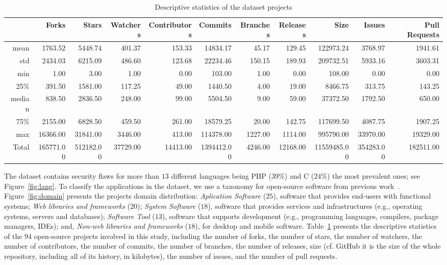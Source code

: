 \documentclass[10pt,conference]{IEEEtran}
\begin{document}
\begin{table}[h]
	\centering
	\caption{Descriptive statistics of the dataset projects}
\begin{tabular}{@{}rrrrrrrrrrr@{}}
\toprule
      & Forks   & Stars   & Watchers & Contributors & Commits  & Branches & Releases & Size      & Issues & Pull Requests  \\ \midrule
mean  & 1763.52 & 5448.74 & 401.37   & 153.33       & 14834.17 & 45.17    & 129.45   & 122973.24 & 3768.97   & 1941.61 \\
std   & 2434.03 & 6215.09 & 486.60   & 123.68       & 22234.46 & 150.15   & 189.93   & 209732.51 & 5933.16   & 3603.31 \\
min   & 1.00       & 3.00       & 1.00        & 0.00            & 103.00      & 1.00        & 0.00        & 108.00       & 0.00         & 0.00       \\
25\%  & 391.50  & 1581.00    & 117.25   & 49.00           & 1440.50  & 4.00        & 19.00       & 8466.75   & 313.75    & 143.25  \\
median  & 838.50  & 2836.50 & 248.00      & 99.00           & 5504.50  & 9.00        & 59.00       & 37372.50  & 1792.50   & 650.00     \\
75\%  & 2155.00    & 6828.50 & 459.50   & 261.00          & 18579.25 & 20.00       & 142.75   & 117699.50 & 4087.75   & 1907.25 \\
max   & 16366.00   & 31841.00   & 3446.00     & 413.00          & 114378.00   & 1227.00     & 1114.00     & 995790.00    & 33970.00     & 19329.00   \\
Total & 165771.00  & 512182.00  & 37729.00    & 14413.00        & 1394412.00  & 4246.00     & 12168.00    & 11559485.00  & 354283.00    & 182511.00  \\ \bottomrule
\end{tabular}
\label{tab:dataset}
\end{table}

The dataset contains security flaws for more than $13$ different languages
being PHP ($39\%$) and C ($24\%$) the most prevalent ones; see Figure~\ref{fig:lang}.
To classify the applications in the dataset, we use a taxonomy for open-source
software from previous work~\cite{7816479}. Figure~\ref{fig:domain}
presents the projects domain distribution: \textit{Aplication Software} ($25$),
software that provides end-users with functional systems; \textit{Web libraries
and frameworks} ($20$); \textit{System Software} ($18$), software that provides
services and infrastructures (e.g., operating systems, servers and databases);
\textit{Software Tool} ($13$), software that supports development (e.g.,
programming languages, compilers, package managers, IDEs); and, \textit{Non-web
libraries and frameworks} ($18$), for desktop and mobile software.
%
Table~\ref{tab:dataset} presents the descriptive statistics of the $94$
open-source projects involved in this study, including the number of forks, the
number of stars, the number of watchers, the number of contributors, the number
of commits, the number of branches, the number of releases,  size (cf. GitHub it
is the size of the whole repository, including all of its history, in
kilobytes), the number of issues, and the number of pull requests.
\end{document}
